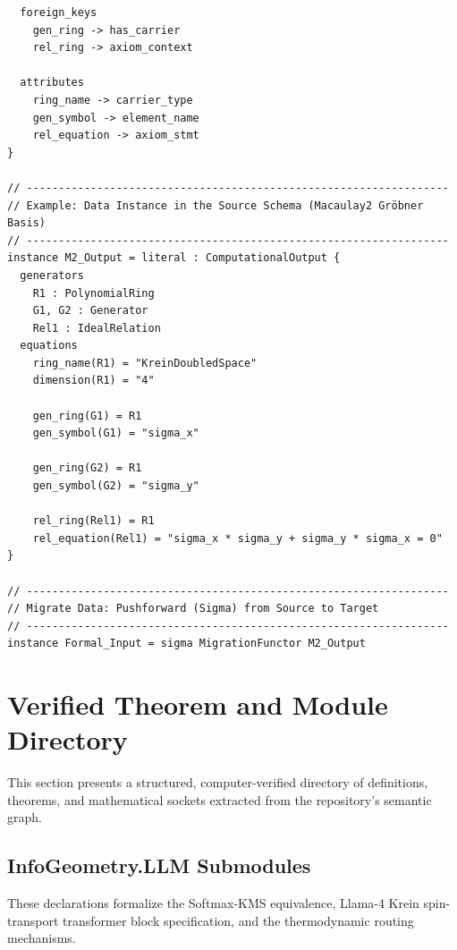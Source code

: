 \documentclass[11pt,a4paper]{article}
\begin{document}
\begin{verbatim}
  foreign_keys
    gen_ring -> has_carrier
    rel_ring -> axiom_context

  attributes
    ring_name -> carrier_type
    gen_symbol -> element_name
    rel_equation -> axiom_stmt
}

// ------------------------------------------------------------------
// Example: Data Instance in the Source Schema (Macaulay2 Gröbner Basis)
// ------------------------------------------------------------------
instance M2_Output = literal : ComputationalOutput {
  generators
    R1 : PolynomialRing
    G1, G2 : Generator
    Rel1 : IdealRelation
  equations
    ring_name(R1) = "KreinDoubledSpace"
    dimension(R1) = "4"
    
    gen_ring(G1) = R1
    gen_symbol(G1) = "sigma_x"
    
    gen_ring(G2) = R1
    gen_symbol(G2) = "sigma_y"
    
    rel_ring(Rel1) = R1
    rel_equation(Rel1) = "sigma_x * sigma_y + sigma_y * sigma_x = 0"
}

// ------------------------------------------------------------------
// Migrate Data: Pushforward (Sigma) from Source to Target
// ------------------------------------------------------------------
instance Formal_Input = sigma MigrationFunctor M2_Output
\end{verbatim}


\section{Verified Theorem and Module Directory}
This section presents a structured, computer-verified directory of definitions, theorems, and mathematical sockets extracted from the repository's semantic graph.

\subsection{InfoGeometry.LLM Submodules}
These declarations formalize the Softmax-KMS equivalence, Llama-4 Krein spin-transport transformer block specification, and the thermodynamic routing mechanisms.
\end{document}
